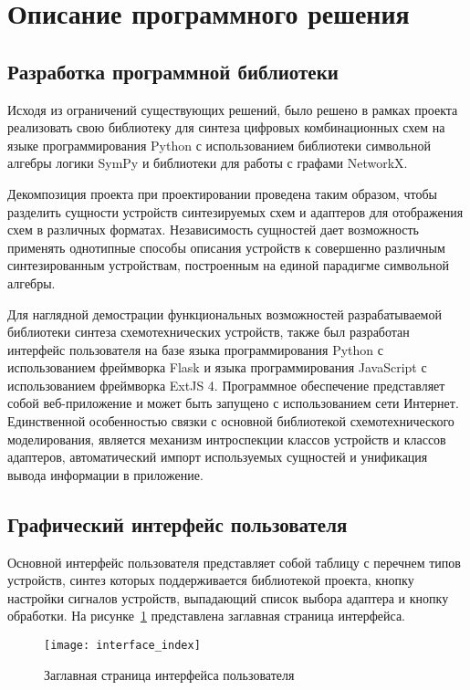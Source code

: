 \documentclass[document.tex]{subfiles}
\begin{document}
\clearpage\section{Описание программного решения}
\subsection{Разработка программной библиотеки}
Исходя из ограничений существующих решений, было решено в рамках проекта
реализовать свою библиотеку для синтеза цифровых комбинационных схем на языке
программирования Python с использованием библиотеки символьной алгебры логики
SymPy и библиотеки для работы с графами NetworkX.

Декомпозиция проекта при проектировании проведена таким образом, чтобы разделить
сущности устройств синтезируемых схем и адаптеров для отображения схем в
различных форматах. Независимость сущностей дает возможность применять
однотипные способы описания устройств к совершенно различным синтезированным
устройствам, построенным на единой парадигме символьной алгебры.

Для наглядной демострации функциональных возможностей разрабатываемой
библиотеки синтеза схемотехнических устройств, также был разработан интерфейс
пользователя на базе языка программирования Python с использованием фреймворка
Flask и языка программирования JavaScript с использованием фреймворка ExtJS 4.
Программное обеспечение представляет собой веб-приложение и может быть запущено с использованием сети
Интернет. Единственной особенностью связки с основной библиотекой
схемотехнического моделирования, является механизм интроспекции классов
устройств и классов адаптеров, автоматический импорт используемых сущностей и
унификация вывода информации в приложение.

\clearpage
\subsection{Графический интерфейс пользователя}
Основной интерфейс пользователя представляет собой таблицу с перечнем типов
устройств, синтез которых поддерживается библиотекой проекта, кнопку настройки сигналов
устройств, выпадающий список выбора адаптера и кнопку обработки.
На рисунке~\ref{fig:interface_index} представлена заглавная страница интерфейса.

\begin{figure}[here]
\texttt{[image: interface\_index]}
\caption{Заглавная страница интерфейса пользователя}
\label{fig:interface_index}
\end{figure}
\end{document}
